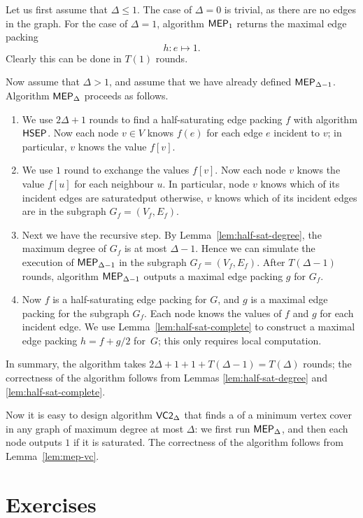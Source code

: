Let us first assume that $\Delta \le 1$. The case of $\Delta = 0$ is trivial, as there are no edges in the graph. For the case of $\Delta = 1$, algorithm $\textsf{MEP}_1$ returns the maximal edge packing
\[
    h\colon e \mapsto 1.
\]
Clearly this can be done in $T(1)$ rounds.

Now assume that $\Delta > 1$, and assume that we have already defined $\textsf{MEP}_{\Delta-1}$. Algorithm $\textsf{MEP}_\Delta$ proceeds as follows.
\begin{enumerate}
    \item We use $2\Delta+1$ rounds to find a half-saturating edge packing $f$ with algorithm $\textsf{HSEP}$. Now each node $v \in V$ knows $f(e)$ for each edge $e$ incident to $v$; in particular, $v$ knows the value $f[v]$.
    \item We use $1$ round to exchange the values $f[v]$. Now each node $v$ knows the value $f[u]$ for each neighbour $u$. In particular, node $v$ knows which of its incident edges are saturated\mydash put otherwise, $v$ knows which of its incident edges are in the subgraph $G_f = (V_f,E_f)$. 
    \item Next we have the recursive step. By Lemma~\ref{lem:half-sat-degree}, the maximum degree of $G_f$ is at most $\Delta-1$. Hence we can simulate the execution of $\textsf{MEP}_{\Delta-1}$ in the subgraph $G_f = (V_f,E_f)$. After $T(\Delta-1)$ rounds, algorithm $\textsf{MEP}_{\Delta-1}$ outputs a maximal edge packing $g$ for $G_f$.
    \item Now $f$ is a half-saturating edge packing for $G$, and $g$ is a maximal edge packing for the subgraph $G_f$. Each node knows the values of $f$ and $g$ for each incident edge. We use Lemma~\ref{lem:half-sat-complete} to construct a maximal edge packing $h = f+g/2$ for~$G$; this only requires local computation.
\end{enumerate}
In summary, the algorithm takes $2\Delta+1+1+T(\Delta-1) = T(\Delta)$ rounds; the correctness of the algorithm follows from Lemmas \ref{lem:half-sat-degree} and \ref{lem:half-sat-complete}.

Now it is easy to design algorithm $\textsf{VC2}_\Delta$ that finds a  of a minimum vertex cover in any graph of maximum degree at most $\Delta$: we first run $\textsf{MEP}_\Delta$, and then each node outputs $1$ if it is saturated. The correctness of the algorithm follows from Lemma~\ref{lem:mep-vc}.


\section{Exercises}\label{sec:combopt-ex}

